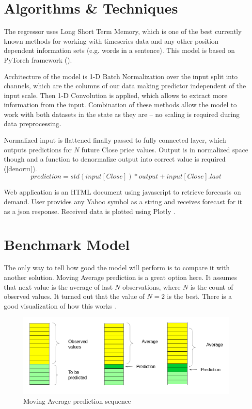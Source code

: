 \documentclass[a4paper,12pt]{article}
\begin{document}
\section{Algorithms \& Techniques}
The regressor uses Long Short Term Memory, which is one of the best currently known methods for working with timeseries data and any other position dependent information sets (e.g. words in a sentence). This model is based on PyTorch framework (\cite{Torch}).

Architecture of the model is 1-D Batch Normalization over the input split into channels, which are the columns of our data making predictor independent of the input scale. Then 1-D Convolution is applied, which allows to extract more information from the input. Combination of these methods allow the model to work with both datasets in the state as they are -- no scaling is required during data preprocessing.

Normalized input is flattened finally passed to fully connected layer, which outputs predictions for $N$ future Close price values. Output is in normalized space though and a function to denormalize output into correct value is required (\ref{denorm}).
\begin{equation}
\label{denorm}
prediction = std(input[Close]) * output + input[Close].last
\end{equation}

Web application is an HTML document using javascript to retrieve forecasts on demand. User provides any Yahoo symbol as a string and receives forecast for it as a json response. Received data is plotted using Plotly \cite{Plotly}.

\section{Benchmark Model}
The only way to tell how good the model will perform is to compare it with another solution. Moving Average prediction is a great option here. It assumes that next value is the average of last $N$ observations, where $N$ is the count of observed values. It turned out that the value of $N = 2$ is the best. There is a good visualization of how this works \cite{Vidhya}.
\begin{figure}[h]
	\centering
	\includegraphics[scale=0.5]{ma}
	\caption{Moving Average prediction sequence \cite{Vidhya}}
\end{figure}
\end{document}
